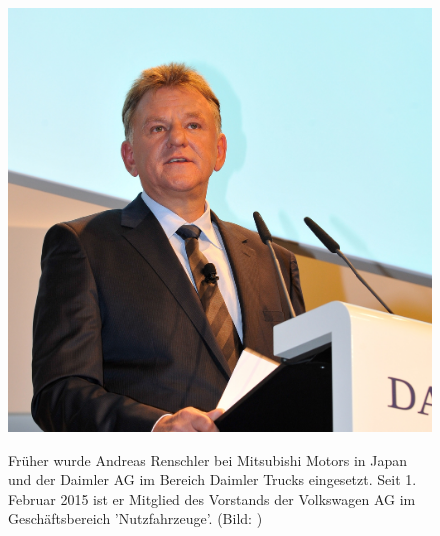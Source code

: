 \documentclass[12pt]{article}
\begin{document}
\begin{figure}[!h]
	\centering
	\begin{minipage}[h]{0.20\textwidth}
		\centering
		\includegraphics[width=1.0\textwidth]{images/AndreasRenschler.jpg}
		\label{fig:vorstandvw6}
	\end{minipage}
	\begin{minipage}[h]{0.10\textwidth}
		\hspace{1cm} 
	\end{minipage}
	\begin{minipage}[h]{0.65\textwidth}
		Früher wurde Andreas Renschler bei Mitsubishi Motors in Japan und der Daimler AG im Bereich Daimler Trucks eingesetzt. Seit 1. Februar 2015 ist er Mitglied des Vorstands der Volkswagen AG im Geschäftsbereich 'Nutzfahrzeuge'. (Bild: \cite{arpic} )
	\end{minipage}
\end{figure}
\end{document}
